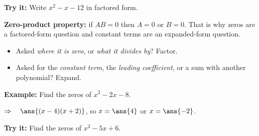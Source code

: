 \documentclass[12pt]{article}
\begin{document}
\begin{tryitbox}
\textbf{Try it:} \quad Write $x^2 - x - 12$ in factored form.\\[2pt]
\end{tryitbox}


\begin{formulabox}
\textbf{Zero-product property:} if $AB = 0$ then $A = 0$ or $B = 0$. That is why zeros are a
factored-form question and constant terms are an expanded-form question.
\begin{itemize}[leftmargin=0.75cm, itemsep=1pt, topsep=2pt]
  \item Asked \emph{where it is zero}, or \emph{what it divides by}? Factor.
  \item Asked for the \emph{constant term}, the \emph{leading coefficient}, or a sum with another
        polynomial? Expand.
\end{itemize}
\end{formulabox}

\begin{examplebox}
\textbf{Example:} \quad Find the zeros of $x^2 - 2x - 8$.

$\Rightarrow\quad \ans{(x - 4)(x + 2)}$, so $x = \ans{4}$ or $x = \ans{-2}$.
\end{examplebox}

\begin{tryitbox}
\textbf{Try it:} \quad Find the zeros of $x^2 - 5x + 6$.\\[2pt]
\end{tryitbox}
\end{document}
